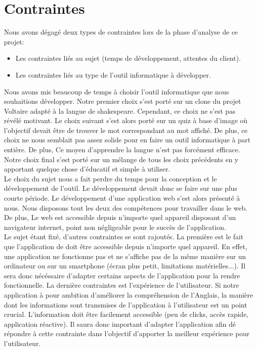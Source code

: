 \documentclass[a4paper,11pt, oneside]{book}
\begin{document}
	\section{Contraintes}

	Nous avons dégagé deux types de contraintes lors de la phase d'analyse de ce projet:
	\begin{itemize}
		\item Les contraintes liés au sujet (temps de développement, attentes du client).
		\item Les contraintes liés au type de l'outil informatique à développer.\\
	\end{itemize}
Nous avons mis beaucoup de temps à choisir l'outil informatique que nous souhaitions développer. Notre premier choix s'est porté sur un clone du projet Voltaire adapté à la langue de shakespeare.
Cependant, ce choix ne s'est pas révélé motivant. Le choix suivant s'est alors porté sur un quiz à base d'image où l'objectif devait être de trouver le mot correspondant au mot affiché. De plus, ce choix
ne nous semblait pas assez solide pour en faire un outil informatique à part entière. De plus, Ce moyen d'apprendre la langue n'est pas forcément efficace.
Notre choix final s'est porté sur un mélange de tous les choix précédents en y apportant quelque chose d'éducatif et simple à utiliser.\\

Le choix du sujet nous a fait perdre du temps pour la conception et le développement de l'outil. Le développement devait donc se faire sur une plus courte période.
Le développement d'une application web s'est alors présenté à nous. Nous disposons tout les deux des compétences pour travailler dans le web.
De plus, Le web est accessible depuis n'importe quel appareil disposant d'un navigateur internet, point non négligeable pour le succès de l'application.\\

Le sujet étant fixé, d'autres contraintes se sont rajoutés. La première est le fait que l'application de doit être accessible depuis n'importe quel appareil. En effet,
une application ne fonctionne pas et ne s'affiche pas de la même manière sur un ordinateur ou sur un smartphone (écran plus petit, limitations matérielles...). Il sera donc nécéssaire
d'adapter certains aspects de l'application pour la rendre fonctionnelle. La dernière contraintes est l'expérience de l'utilisateur. Si notre application à pour ambition d'améliorer
la compréhension de l'Anglais, la manière dont les informations sont transmises de l'application à l'utilisateur est un point crucial. L'information doit être facilement accessible (peu de clicks, accès rapide, application réactive).
Il saura donc important d'adapter l'application afin dé répondre à cette contrainte dans l'objectif d'apporter la meilleur expérience pour l'utilisateur.
\end{document}
